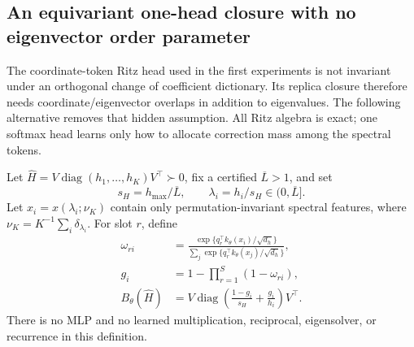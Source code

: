 \documentclass[11pt]{article}
\begin{document}
\subsection{An equivariant one-head closure with no eigenvector order parameter}

The coordinate-token Ritz head used in the first experiments is not invariant
under an orthogonal change of coefficient dictionary.  Its replica closure
therefore needs coordinate/eigenvector overlaps in addition to eigenvalues.
The following alternative removes that hidden assumption.  All Ritz algebra
is exact; one softmax head learns only how to allocate correction mass among
the spectral tokens.

Let $\widehat H=V\operatorname{diag}(h_1,\ldots,h_K)V^\top\succ0$, fix a certified
$\overline L>1$, and set
\[
 s_H=h_{\max}/\overline L,
 \qquad \lambda_i=h_i/s_H\in(0,\overline L].
\]
Let $x_i=x(\lambda_i;\nu_K)$ contain only permutation-invariant spectral
features, where $\nu_K=K^{-1}\sum_i\delta_{\lambda_i}$.  For slot $r$, define
\begin{equation}
\begin{aligned}
 \omega_{ri}
 &=\frac{\exp\{q_r^\top k_\theta(x_i)/\sqrt{d_h}\}}
 {\sum_j\exp\{q_r^\top k_\theta(x_j)/\sqrt{d_h}\}},\\
 g_i&=1-\prod_{r=1}^{S}(1-\omega_{ri}),\\
 B_\theta(\widehat H)
 &=V\operatorname{diag}\!\left(
 \frac{1-g_i}{s_H}+\frac{g_i}{h_i}
 \right)V^\top .
\end{aligned}
 \label{eq:equivariant-ritz-head}
\end{equation}
There is no MLP and no learned multiplication, reciprocal, eigensolver, or
recurrence in this definition.
\end{document}

